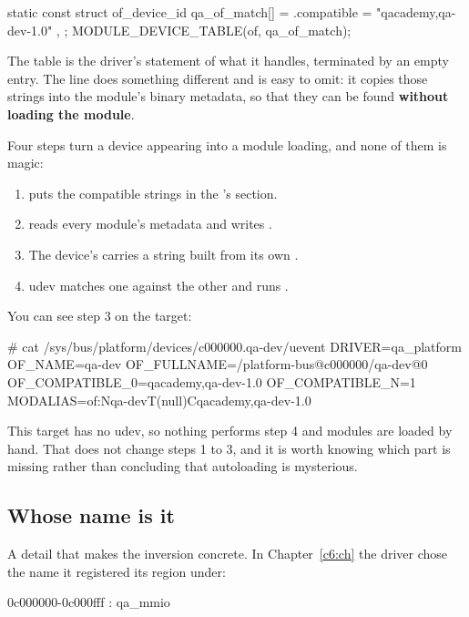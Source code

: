 \begin{ccode}
static const struct of_device_id qa_of_match[] = {
        { .compatible = "qacademy,qa-dev-1.0" },
        { }
};
MODULE_DEVICE_TABLE(of, qa_of_match);
\end{ccode}

\noindent The table is the driver's statement of what it handles, terminated by an empty entry. The
 line does something different and is easy to omit: it copies those
strings into the module's binary metadata, so that they can be found \textbf{without loading the
module}.

Four steps turn a device appearing into a module loading, and none of them is magic:
\begin{enumerate}
  \item {} puts the compatible strings in the 's 
    section.
  \item {} reads every module's metadata and writes
    .
  \item The device's  carries a  string built from its own
    .
  \item udev matches one against the other and runs .
\end{enumerate}
You can see step 3 on the target:

\begin{console}
# cat /sys/bus/platform/devices/c000000.qa-dev/uevent
DRIVER=qa_platform
OF_NAME=qa-dev
OF_FULLNAME=/platform-bus@c000000/qa-dev@0
OF_COMPATIBLE_0=qacademy,qa-dev-1.0
OF_COMPATIBLE_N=1
MODALIAS=of:Nqa-devT(null)Cqacademy,qa-dev-1.0
\end{console}

\noindent This target has no udev, so nothing performs step 4 and modules are loaded by hand. That
does not change steps 1 to 3, and it is worth knowing which part is missing rather than concluding
that autoloading is mysterious.

\subsection{Whose name is it}
\label{c10:app:a6}

A detail that makes the inversion concrete. In Chapter~\ref{c6:ch} the driver chose the name it
registered its region under:

\begin{console}
0c000000-0c000fff : qa_mmio
\end{console}

